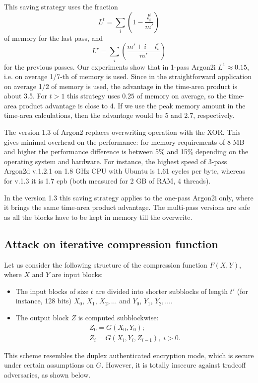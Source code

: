 \documentclass[a4paper]{article}
\begin{document}
This  saving strategy uses the fraction
$$
L^t = \sum_i\left(1 - \frac{l_i^t}{m'}\right) 
$$
of memory for the last pass, and 
$$
L^r = \sum_i\left(\frac{m'+i-l_i^r}{m'}\right)
$$
for the previous passes.
Our experiments show that in 1-pass Argon2i $L^1\approx 0.15$, i.e. on average 1/7-th of memory is used. Since in the straightforward application on average 1/2 of memory is used, the advantage in the time-area product is about 3.5. 
For $t>1$ this strategy uses $0.25$ of memory on average, so the time-area product advantage is close to 4. If we use the peak memory amount in the time-area calculations, then the advantage would be 5 and 2.7, respectively.


The version 1.3 of Argon2 replaces  overwriting operation with the XOR. This gives minimal overhead on the performance: for memory requirements of 8 MB and higher the performance difference is between 5\% and 15\% depending on the operating system and hardware. For instance, the highest speed of 3-pass Argon2d v.1.2.1 on 1.8 GHz CPU with Ubuntu is 1.61 cycles per byte, whereas for v.1.3 it is 1.7 cpb (both measured for 2 GB of RAM, 4 threads).

In the  version 1.3 this saving strategy applies to the one-pass Argon2i only, where it brings the same time-area product advantage. The multi-pass versions are safe as all the blocks have to be kept in memory till the overwrite. 

\subsection{Attack on iterative compression function}\label{sec:att-iter}

Let us consider the following structure of the compression function $F(X,Y)$, where $X$ and $Y$ are input blocks:
\begin{itemize}
  \item The input blocks of size $t$ are divided into shorter subblocks of length $t'$ (for instance, 128 bits) $X_0$, $X_1$, $X_2,\ldots$ and $Y_0$, $Y_1$, $Y_2,\ldots$.
  \item The output block $Z$ is computed subblockwise:
  \begin{align*}
    Z_0 = G(X_0,Y_0);\\
    Z_i = G(X_i,Y_i,Z_{i-1}),\;i>0.
  \end{align*}
\end{itemize}
This scheme resembles the duplex authenticated encryption mode, which is secure under certain assumptions on $G$. However, it is totally insecure against tradeoff adversaries, as shown below.
\end{document}
